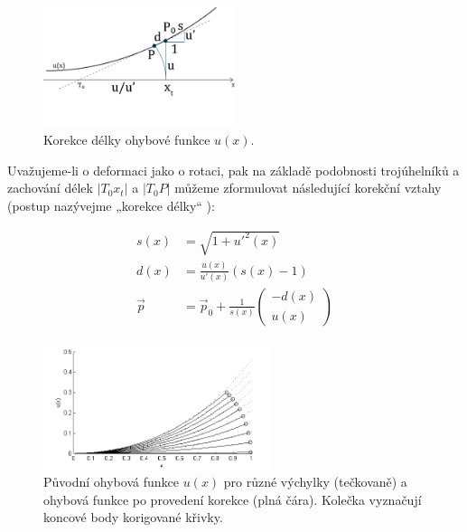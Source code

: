 \begin{figure}[!hbt]
\begin{center}
\includegraphics[width=0.5\textwidth]{./figures/lengthCorrection3.png}
\end{center}
\caption{Korekce délky ohybové funkce $u(x)$.
\label{fig:bendCorrection}
}
\end{figure}

Uvažujeme-li o deformaci jako o rotaci, pak na základě podobnosti trojúhelníků a zachování délek $|T_0x_t|$ a $|T_0P|$ můžeme zformulovat následující korekční vztahy (postup nazývejme „korekce délky“ ):

\begin{align} 
 \label{lengthCorrection}
s(x) &= \sqrt{1 + u'^{2}(x)}\nonumber\\
d(x) &= \frac{u(x)}{u'(x)}(s(x)-1)\nonumber
\\
\vec{p} &= \vec{p}_0 + \frac{1}{s(x)}\begin{pmatrix}
-d(x)\\u(x) 
\end{pmatrix}
\end{align}

 

\begin{figure}[!hbt]
\begin{center}
\includegraphics[width=0.60\textwidth]{./figures/lengthCorrectionErrorGraph2.png}
\end{center}
\caption{Původní ohybová funkce $u(x)$ pro různé výchylky (tečkovaně) a ohybová funkce po provedení korekce (plná čára). Kolečka vyznačují koncové body korigované křivky.
\label{fig:bendCorrectionGraph}
}
\end{figure}


